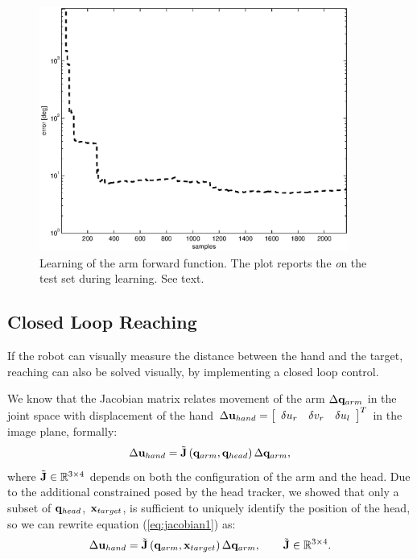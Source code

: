 \begin{figure}[tbp]
\centerline{
\includegraphics[width=4.0in, angle=0 ]{./Figure/reachingError1.eps}
} \caption{Learning of the arm forward function. The plot reports the \emph 
on the test set during learning. See text.}\label{fig:reaching-error}
\end{figure}

\subsection{Closed Loop Reaching} \label{Eq:ClosedLoop}
%
If the robot can visually measure the distance
between the hand and the target, reaching can also be solved
visually, by implementing a closed loop control.

We know that the Jacobian matrix relates movement of the arm 
$\Delta \mathbf {q}_{arm}$ in the joint space with displacement of the hand 
\begin{math}\Delta \mathbf {u}_{hand}=
\left[ \begin{array}{ccc}
  \delta u_r & \delta v_r & \delta u_{l}
\end{array} \right]^T\end{math} 
in the image plane, formally:
%
\begin{equation} 
\label{eq:jacobian1}
  \Delta \mathbf {u}_{hand}=
  \tilde{\mathbf J}\left(\mathbf q_{arm}, \mathbf q_{head}\right)
  \Delta \mathbf {q}_{arm},
\end{equation}
%
where $\tilde{\mathbf J} \in \mathbb R^{3 \times 4}$ depends on 
both the configuration of the arm and the head. Due to the 
additional constrained posed by the head tracker, we showed
that only a subset of $\mathbf{q}_{head}$, $\mathbf{x}_{target}$, is 
sufficient to uniquely identify the position of the head, so we 
can rewrite equation (\ref{eq:jacobian1}) as:
%
\begin{equation}
\label{eq:jacobian2}
  \Delta \mathbf {u}_{hand}=
  \tilde{\mathbf J}\left(\mathbf q_{arm}, \mathbf{x}_{target}\right)
  \Delta \mathbf {q}_{arm}, \qquad \tilde{\mathbf J} \in \mathbb R^{3 \times 4}.
\end{equation}
%

